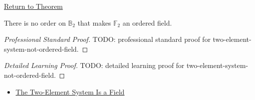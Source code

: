 \newpage
{}
\label{prf:two-element-system-not-ordered-field}

\begin{remark*}[Return]
\hyperref[thm:two-element-system-not-ordered-field]{Return to Theorem}
\end{remark*}

\begin{theorem*}
There is no order on \(\mathbb{B}_2\) that makes \(\mathbb{F}_2\) an ordered
field.
\end{theorem*}

\begin{proof}[Professional Standard Proof]
\LRAProofBodyStart
TODO: professional standard proof for two-element-system-not-ordered-field.
\end{proof}

\begin{proof}[Detailed Learning Proof]
\LRAProofBodyStart
TODO: detailed learning proof for two-element-system-not-ordered-field.
\end{proof}

\begin{remark*}
\end{remark*}

\begin{dependencies}
\begin{itemize}
  \item \hyperref[thm:two-element-system-is-field]{The Two-Element System Is a Field}
\end{itemize}
\end{dependencies}

\clearpage
